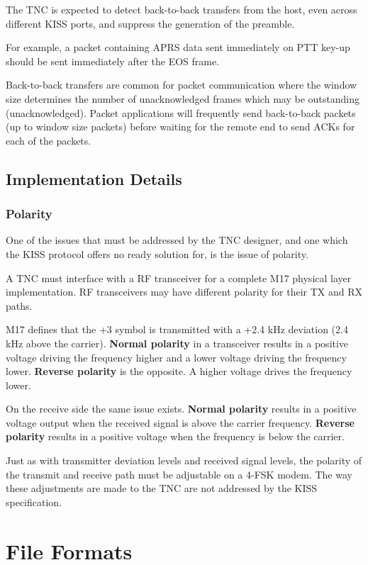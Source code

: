 \documentclass[a4paper,11pt]{book}
\begin{document}
The TNC is expected to detect back-to-back transfers from the host, even across different KISS ports, and suppress the generation of the preamble.

For example, a packet containing APRS data sent immediately on PTT key-up should be sent immediately after the EOS frame.

Back-to-back transfers are common for packet communication where the window size determines the number of unacknowledged frames which may be outstanding (unacknowledged). Packet applications will frequently send back-to-back packets (up to window size packets) before waiting for the remote end to send ACKs for each of the packets.

\section{Implementation Details}

\subsection{Polarity}

One of the issues that must be addressed by the TNC designer, and one which the KISS protocol offers no ready solution for, is the issue of polarity.

A TNC must interface with a RF transceiver for a complete M17 physical layer implementation. RF transceivers may have different polarity for their TX and RX paths.

M17 defines that the +3 symbol is transmitted with a +2.4 kHz deviation (2.4 kHz above the carrier). \textbf{Normal polarity} in a transceiver results in a positive voltage driving the frequency higher and a lower voltage driving the frequency lower. \textbf{Reverse polarity} is the opposite. A higher voltage drives the frequency lower.

On the receive side the same issue exists. \textbf{Normal polarity} results in a positive voltage output when the received signal is above the carrier frequency. \textbf{Reverse polarity} results in a positive voltage when the frequency is below the carrier.

Just as with transmitter deviation levels and received signal levels, the polarity of the transmit and receive path must be adjustable on a 4-FSK modem. The way these adjustments are made to the TNC are not addressed by the KISS specification.

\chapter{File Formats}
\end{document}
